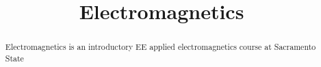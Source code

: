 \documentclass{xourse}
\title{Electromagnetics}
\begin{document}
  
\begin{abstract} %
Electromagnetics is an introductory EE applied electromagnetics course at Sacramento State
\end{abstract}  
\maketitle  
 
\end{document}
